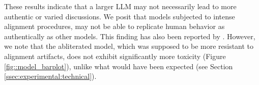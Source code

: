 These results indicate that a larger \ac{LLM} may not necessarily lead to more authentic or varied discussions. We posit that models subjected to intense alignment procedures, may not be able to replicate human behavior as authentically as other models. This finding has also been reported by \citet{Park2023GenerativeAI}. However, we note that the abliterated model, which was supposed to be more resistant to alignment artifacts, does not exhibit significantly more toxicity (Figure \ref{fig::model_barplot}), unlike what would have been expected (see Section \ref{ssec:experimental:technical}).








